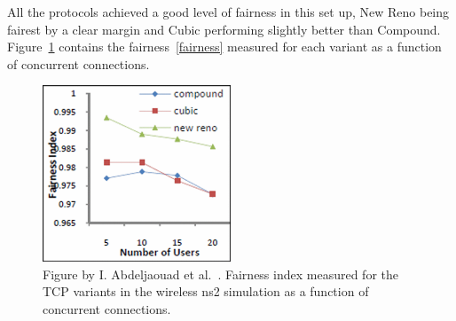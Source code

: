 All the protocols achieved a good level of fairness in this set up, New Reno being fairest by a clear margin and Cubic performing slightly better than Compound. Figure~\ref{fig:fairness2} contains the fairness~\eqref{fairness} measured for each variant as a function of concurrent connections.

\begin{figure}
	\includegraphics[width=0.5\textwidth]{images/abdeljaouad10_fairness_2.png}
	\caption{Figure by I. Abdeljaouad et al.~\cite{Abdeljaouad10}. Fairness index measured for the TCP variants in the wireless ns2 simulation as a function of concurrent connections.}
	\label{fig:fairness2}
\end{figure}